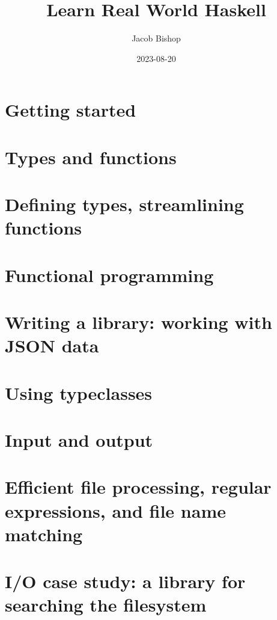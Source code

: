 \documentclass[UTF8]{ctexart}
\title{Learn Real World Haskell}
\author{Jacob Bishop}
\date{2023-08-20}
\begin{document}
\maketitle
\newpage

\section{Getting started}

\newpage

\section{Types and functions}

\newpage

\section{Defining types, streamlining functions}

\newpage

\section{Functional programming}

\newpage

\section{Writing a library: working with JSON data}

\newpage

\section{Using typeclasses}

\newpage

\section{Input and output}

\newpage

\section{Efficient file processing, regular expressions, and file name matching}

\newpage

\section{I/O case study: a library for searching the filesystem}

\newpage
\end{document}
